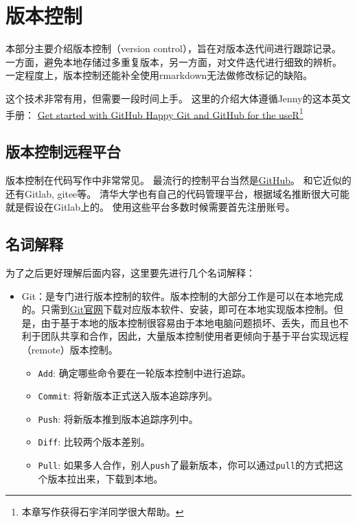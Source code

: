 \documentclass[
  letterpaper,
  DIV=11,
  numbers=noendperiod,
  oneside]{scrreprt}
\providecommand{\tightlist}{%
  \setlength{\itemsep}{0pt}\setlength{\parskip}{0pt}}\usepackage{longtable,booktabs,array}
\begin{document}

\hypertarget{ux7248ux672cux63a7ux5236}{%
\chapter{版本控制}\label{ux7248ux672cux63a7ux5236}}

本部分主要介绍版本控制（version
control），旨在对版本迭代间进行跟踪记录。
一方面，避免本地存储过多重复版本，另一方面，对文件迭代进行细致的辨析。
一定程度上，版本控制还能补全使用rmarkdown无法做修改标记的缺陷。

这个技术非常有用，但需要一段时间上手。
这里的介绍大体遵循Jenny的这本英文手册：
\href{https://happygitwithr.com/}{Get started with GitHub \textbar{}
Happy Git and GitHub for the useR}\footnote{本章写作获得石宇洋同学很大帮助。}

\hypertarget{ux7248ux672cux63a7ux5236ux8fdcux7a0bux5e73ux53f0}{%
\section{版本控制远程平台}\label{ux7248ux672cux63a7ux5236ux8fdcux7a0bux5e73ux53f0}}

版本控制在代码写作中非常常见。
最流行的控制平台当然是\href{https://github.com/}{GitHub}。
和它近似的还有Gitlab, gitee等。
清华大学也有自己的代码管理平台，根据域名推断很大可能就是假设在Gitlab上的。
使用这些平台多数时候需要首先注册账号。

\hypertarget{ux540dux8bcdux89e3ux91ca}{%
\section{名词解释}\label{ux540dux8bcdux89e3ux91ca}}

为了之后更好理解后面内容，这里要先进行几个名词解释：

\begin{itemize}
\tightlist
\item
  Git：是专门进行版本控制的软件。版本控制的大部分工作是可以在本地完成的。只需到\href{https://git-scm.com}{Git官网}下载对应版本软件、安装，即可在本地实现版本控制。但是，由于基于本地的版本控制很容易由于本地电脑问题损坏、丢失，而且也不利于团队共享和合作，因此，大量版本控制使用者更倾向于基于平台实现远程（remote）版本控制。

  \begin{itemize}
  \tightlist
  \item
    \texttt{Add}: 确定哪些命令要在一轮版本控制中进行追踪。
  \item
    \texttt{Commit}: 将新版本正式送入版本追踪序列。
  \item
    \texttt{Push}: 将新版本推到版本追踪序列中。
  \item
    \texttt{Diff}: 比较两个版本差别。
  \item
    \texttt{Pull}:
    如果多人合作，别人\texttt{push}了最新版本，你可以通过\texttt{pull}的方式把这个版本拉出来，下载到本地。
  \end{itemize}
\end{itemize}
\end{document}
